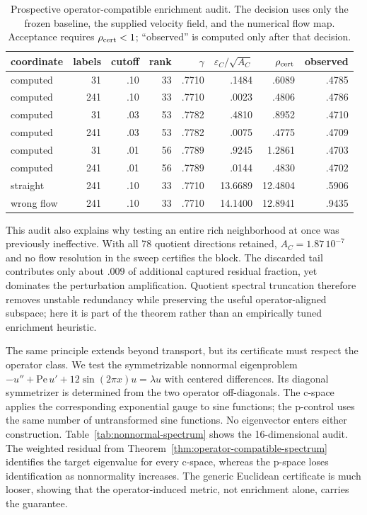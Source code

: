 \documentclass[11pt]{article}
\numberwithin{algorithm}{section}
\theoremstyle{definition}\newtheorem{definition}[theorem]{Definition}
\theoremstyle{remark}\newtheorem{remark}[theorem]{Remark}
\begin{document}
\begin{table}[t]
\centering
\caption{Prospective operator-compatible enrichment audit.  The decision uses
only the frozen baseline, the supplied velocity field, and the numerical flow
map.  Acceptance requires $\rho_{\rm cert}<1$; ``observed'' is computed only
after that decision.}
\label{tab:operator-compatible-certificate}
\begin{tabular}{lrrrrrrr}
\toprule
coordinate & labels & cutoff & rank & $\gamma$ &
$\varepsilon_C/\sqrt{A_C}$ & $\rho_{\rm cert}$ & observed\\
\midrule
computed & 31  & .10 & 33 & .7710 & .1484 & .6089 & .4785\\
computed & 241 & .10 & 33 & .7710 & .0023 & .4806 & .4786\\
computed & 31  & .03 & 53 & .7782 & .4810 & .8952 & .4710\\
computed & 241 & .03 & 53 & .7782 & .0075 & .4775 & .4709\\
computed & 31  & .01 & 56 & .7789 & .9245 & 1.2861 & .4703\\
computed & 241 & .01 & 56 & .7789 & .0144 & .4830 & .4702\\
straight & 241 & .10 & 33 & .7710 & 13.6689 & 12.4804 & .5906\\
wrong flow & 241 & .10 & 33 & .7710 & 14.1400 & 12.8941 & .9435\\
\bottomrule
\end{tabular}
\end{table}

This audit also explains why testing an entire rich neighborhood at once was
previously ineffective.  With all 78 quotient directions retained,
$A_C=1.87\,10^{-7}$ and no flow resolution in the sweep certifies the block.
The discarded tail contributes only about $.009$ of additional captured
residual fraction, yet dominates the perturbation amplification.  Quotient
spectral truncation therefore removes unstable redundancy while preserving
the useful operator-aligned subspace; here it is part of the theorem rather
than an empirically tuned enrichment heuristic.

The same principle extends beyond transport, but its certificate must respect
the operator class.  We test the symmetrizable nonnormal eigenproblem
$-u''+\mathrm{Pe}\,u'+12\sin(2\pi x)u=\lambda u$ with centered differences.
Its diagonal symmetrizer is determined from the two operator off-diagonals.
The c-space applies the corresponding exponential gauge to sine functions;
the p-control uses the same number of untransformed sine functions.  No
eigenvector enters either construction.  Table~\ref{tab:nonnormal-spectrum}
shows the 16-dimensional audit.  The weighted residual from
Theorem~\ref{thm:operator-compatible-spectrum} identifies the target
eigenvalue for every c-space, whereas the p-space loses identification as
nonnormality increases.  The generic Euclidean certificate is much looser,
showing that the operator-induced metric, not enrichment alone, carries the
guarantee.
\end{document}
